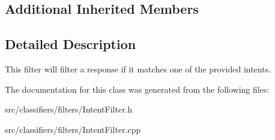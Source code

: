 \subsection*{Additional Inherited Members}


\subsection{Detailed Description}
This filter will filter a response if it matches one of the provided intents. 

The documentation for this class was generated from the following files\+:\begin{DoxyCompactItemize}
\item 
src/classifiers/filters/Intent\+Filter.\+h\item 
src/classifiers/filters/Intent\+Filter.\+cpp\end{DoxyCompactItemize}
